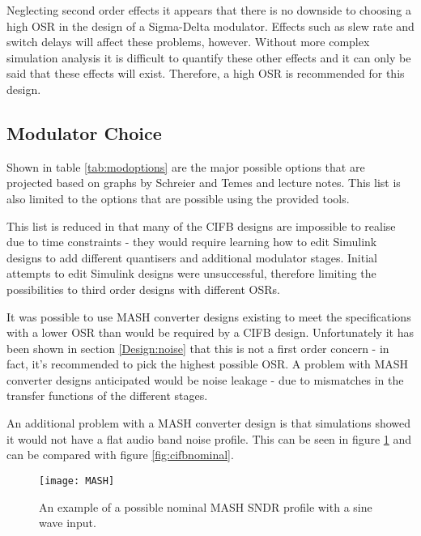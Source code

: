 

Neglecting second order effects it appears that there is no downside to choosing a high OSR in the design of a Sigma-Delta modulator.
Effects such as slew rate and switch delays will affect these problems, however.
Without more complex simulation analysis it is difficult to quantify these other effects and it can only be said that these effects will exist.
Therefore, a high OSR is recommended for this design.

\subsection{Modulator Choice}
Shown in table \ref{tab:modoptions} are the major possible options that are projected based on graphs by Schreier and Temes and lecture notes.
This list is also limited to the options that are possible using the provided tools.



This list is reduced in that many of the CIFB designs are impossible to realise due to time constraints - they would require learning how to edit Simulink designs to add different quantisers and additional modulator stages.
Initial attempts to edit Simulink designs were unsuccessful, therefore limiting the possibilities to third order designs with different OSRs.

It was possible to use MASH converter designs existing to meet the specifications with a lower OSR than would be required by a CIFB design.
Unfortunately it has been shown in section \ref{Design:noise} that this is not a first order concern - in fact, it's recommended to pick the highest possible OSR.
A problem with MASH converter designs anticipated would be noise leakage\cite{textbook} - due to mismatches in the transfer functions of the different stages.

An additional problem with a MASH converter design is that simulations showed it would not have a flat audio band noise profile.
This can be seen in figure \ref{fig:MASH} and can be compared with figure \ref{fig:cifbnominal}.

\begin{figure}
    \begin{center}
    \texttt{[image: MASH]}
    \label{fig:MASH}
    \caption{An example of a possible nominal MASH SNDR profile with a sine wave input.}
    \end{center}
\end{figure}

